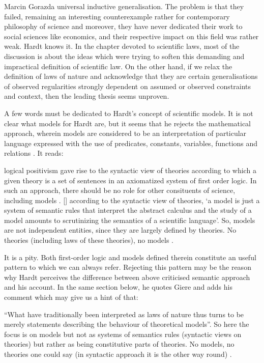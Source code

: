 \begin{recengenv}{Marcin Gorazda}
universal inductive generalisation. The problem is that they failed, remaining an interesting counterexample rather for
contemporary philosophy of science and moreover, they have never dedicated their work to social sciences like
economics, and their respective impact on this field was rather weak. Hardt knows it. In the chapter devoted to
scientific laws, most of the discussion is about the ideas which were trying to soften this demanding and impractical
definition of scientific law. On the other hand, if we relax the definition of laws of nature and acknowledge that they
are certain generalisations of observed regularities strongly dependent on assumed or observed constraints and context,
then the leading thesis seems unproven. 

A few words must be dedicated to Hardt’s concept of scientific models. It is not clear what models for Hardt are, but it
seems that he rejects the mathematical approach, wherein models are considered to be an interpretation of particular
language expressed with the use of predicates, constants, variables, functions and relations
\parencite{margaris_first_1990}.
It reads:

\begin{myquoterev}
[\mydots] logical positivism gave rise to the syntactic view of theories according to which a given theory is a set of
sentences in an axiomatized system of first order logic. In such an approach, there should be no role for other
consituents of science, including models . [\mydots] according to the syntactic view of theories, ‘a model is just a system
of semantic rules that interpret the abstract calculus and the study of a model amounts to scrutinizing the semantics
of a scientific language’. So, models are not independent entities, since they are largely defined by theories. No
theories (including laws of these theories), no models
\parencite[p.71]{hardt_economics_2017}.
\end{myquoterev}

It is a pity. Both first-order logic and models defined therein constitute an useful pattern to which we can always
refer. Rejecting this pattern may be the reason why Hardt perceives the difference between above criticised semantic
approach and his account. In the same section below, he quotes Giere and adds his comment which may give us a hint of
that:

\begin{myquoterev}
``What have traditionally been interpreted as laws of nature thus turns to be merely statements describing the behaviour
of theoretical models''. So here the focus is on models but not as systems of semantics rules (syntactic views on
theories) but rather as being constitutive parts of theories. No models, no theories one could say (in syntactic
approach it is the other way round)
\parencite[p.72]{hardt_economics_2017}.
\end{myquoterev}


\end{recengenv}
